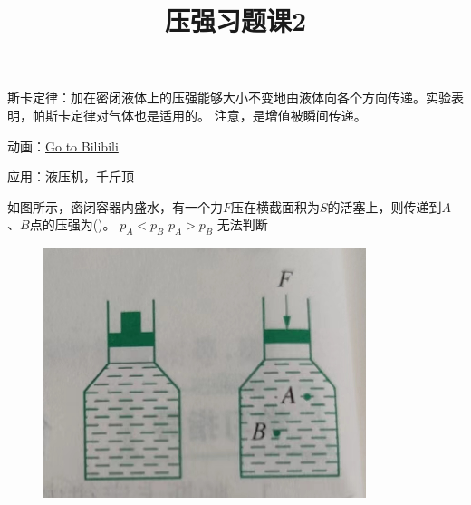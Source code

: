 \documentclass[a4paper,cs4size]{BHCexam}
\title{压强习题课2}
\begin{document}
\maketitle
\begin{groups}
    斯卡定律：加在密闭液体上的压强能够大小不变地由液体向各个方向传递。实验表明，帕斯卡定律对气体也是适用的。
    注意，是增值被瞬间传递。

    动画：\href{https://www.bilibili.com/video/BV1EA411M7Zu/?spm_id_from=333.337.search-card.all.click&vd_source=2329e0d9ebf298ab4960a6d3a7eecf56}{Go to Bilibili}

    应用：液压机，千斤顶

    \begin{questions}[]

        \question[5] 如图所示，密闭容器内盛水，有一个力$F$压在横截面积为$S$的活塞上，则传递到$A$、$B$点的压强为(\quad\quad\quad)。
        {$p_A<p_B$}
        {$p_A>p_B$}
        {无法判断}
        \begin{figure}[htb]
            \flushright
            \includegraphics [scale=0.4,trim=0 0 0 0]{./image/physics_pressure2_1.png}
            \label{fig:fig_pressure2_1}
        \end{figure}
        \vspace{1cm}


\end{questions}
\end{groups}
\end{document}
